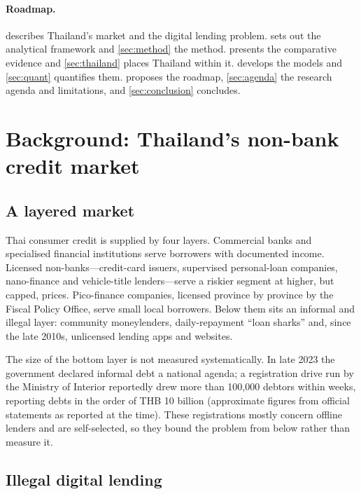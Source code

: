 \documentclass[11pt]{article}
\theoremstyle{plain}
\theoremstyle{definition}
\theoremstyle{remark}
\begin{document}
\paragraph{Roadmap.}  describes Thailand's market and the digital lending problem.  sets out the analytical framework and \cref{sec:method} the method.  presents the comparative evidence and \cref{sec:thailand} places Thailand within it.  develops the models and \cref{sec:quant} quantifies them.  proposes the roadmap, \cref{sec:agenda} the research agenda and limitations, and \cref{sec:conclusion} concludes.

\section{Background: Thailand's non-bank credit market}\label{sec:background}

\subsection{A layered market}

Thai consumer credit is supplied by four layers. Commercial banks and specialised financial institutions serve borrowers with documented income. Licensed non-banks---credit-card issuers, supervised personal-loan companies, nano-finance and vehicle-title lenders---serve a riskier segment at higher, but capped, prices. Pico-finance companies, licensed province by province by the Fiscal Policy Office, serve small local borrowers. Below them sits an informal and illegal layer: community moneylenders, daily-repayment ``loan sharks'' and, since the late 2010s, unlicensed lending apps and websites.

The size of the bottom layer is not measured systematically. In late 2023 the government declared informal debt a national agenda; a registration drive run by the Ministry of Interior reportedly drew more than 100,000 debtors within weeks, reporting debts in the order of THB 10 billion (approximate figures from official statements as reported at the time). These registrations mostly concern offline lenders and are self-selected, so they bound the problem from below rather than measure it.

\subsection{Illegal digital lending}
\end{document}
